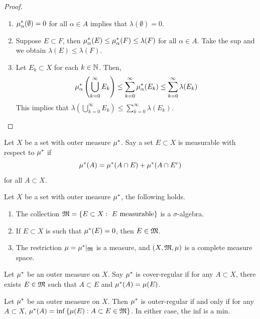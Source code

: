 \documentclass[a4paper]{article}
\renewcommand{\cupinfk}{\bigcup_{k=0}^\infty}
\renewcommand{\suminfk}{\sum_{k=0}^\infty}
\begin{document}
\begin{proof}
  \begin{enumerate}
    \item $\mu^*_\alpha(\emptyset) = 0$ for all $\alpha \in A$
          implies that $\lambda(\emptyset) = 0$.

    \item Suppose $E \subset F$, then $\mu^*_\alpha(E) \leq \mu^*_\alpha(F)
          \leq \lambda(F)$ for all $\alpha \in A$. Take the sup and we
          obtain $\lambda(E) \leq \lambda(F)$.

    \item Let $E_k \subset X$ for each $k \in \mathbb{N}$. Then,
          \[
            \om_\alpha \left( \cupinfk E_k \right)
            \leq \suminfk \om_\alpha (E_k)
            \leq \suminfk \lambda(E_k)
          \]
          This implies that $\lambda(\cupinfk E_k) \leq \suminfk
          \lambda(E_k)$.
  \end{enumerate}
\end{proof}

\begin{defi}
  Let $X$ be a set with outer measure $\mu^*$. Say a set $E \subset X$ is
  measurable with respect to $\mu^*$ if
  \[
    \mu^*(A) = \mu^*(A \cap E) + \mu^*(A \cap E^c)
  \]
  for all $A \subset X$.
\end{defi}

\begin{thm}
  Let $X$ be a set with outer measure $\mu^*$, the following
  holds.
  \begin{enumerate}
    \item The collection $\mathfrak{M} = \left\{ E \subset X: \text{ $E$
          measurable} \right\}$ is a $\sigma$-algebra.
    \item If $E \subset X$ is such that $\mu^*(E) = 0$, then $E \in \mathfrak{M}$.
    \item The restriction $\mu = \mu^* \vert_{\mathfrak{M}}$ is a measure, and $(X,
          \mathfrak{M}, \mu)$ is a complete measure space.
  \end{enumerate}
\end{thm}

\begin{defi}
  Let $\mu^*$ be an outer measure on $X$. Say $\mu^*$
  is cover-regular if for any $A \subset X$, there
  exists $E \in \mathfrak{M}$ such that $A \subset E$
  and $\mu^*(A) = \mu(E)$.
\end{defi}

\begin{prop}
  Let $\mu^*$ be an outer measure on $X$. Then $\mu^*$ is outer-regular if and
  only if for any $A \subset X$, $\mu^*(A) = \inf \left\{ \mu(E) : A \subset
    E \in \mathfrak{M} \right\}$. In either case, the inf is a min.
\end{prop}
\end{document}
